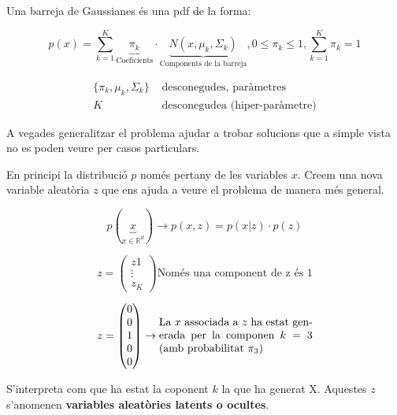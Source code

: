 \documentclass[a4paper]{article}
\begin{document}
Una barreja de Gaussianes és una pdf de la forma:

$$ p(x) = \sum_{k=1}^K \underbrace{\pi_k}_{\text{Coeficients}}·\underbrace{N(x, \mu_k, \Sigma_k)}_{\text{Components de la barreja}}, 0 \le \pi_k \le 1, \sum_{k=1}^K \pi_k = 1$$

\begin{align*}
	\{\pi_k, \mu_k, \Sigma_k\} & \text{  desconegudes, paràmetres} \\
	K & \text{  desconegudea (hiper-paràmetre)}
\end{align*}

A vegades generalitzar el problema ajudar a trobar solucions que a simple vista no es poden veure per casos particulars. 

En principi la distribució $p$ només pertany de les variables $x$. Creem una nova variable aleatòria $z$ que ens ajuda a veure el problema de manera més general.

$$
p(\underbrace{x}_{x \in \mathbb{R}^d}) \rightarrow p(x,z) = p(x|z)·p(z)
$$

$$ 
z = 
\begin{pmatrix}
z1 \\ \vdots \\ z_K
\end{pmatrix} \text{Només una component de z és 1} 
$$

$$
z = 
\begin{pmatrix}
0 \\
0 \\
1 \\
0 \\
0
\end{pmatrix}
\rightarrow
\parbox{14em}{La $x$ associada a $z$ ha estat generada per la componen $k=3$ (amb probabilitat $\pi_3$)}
$$

S'interpreta com que ha estat la coponent $k$ la que ha generat X. Aquestes $z$ s'anomenen \textbf{variables aleatòries latents o ocultes}.
\end{document}
